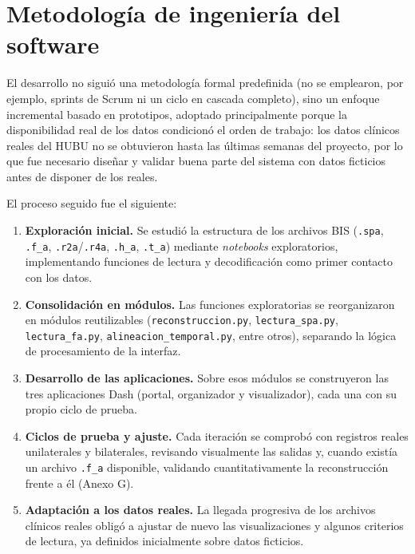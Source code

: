 \documentclass[
  spanish,
  a4paper,
  12pt,
  twoside]{memoir}
\providecommand{\tightlist}{%
  \setlength{\itemsep}{0pt}\setlength{\parskip}{0pt}}
\begin{document}
\chapter{Metodología de ingeniería del
software}\label{metodologuxeda-de-ingenieruxeda-del-software}

El desarrollo no siguió una metodología formal predefinida (no se
emplearon, por ejemplo, sprints de Scrum ni un ciclo en cascada
completo), sino un enfoque incremental basado en prototipos, adoptado
principalmente porque la disponibilidad real de los datos condicionó el
orden de trabajo: los datos clínicos reales del HUBU no se obtuvieron
hasta las últimas semanas del proyecto, por lo que fue necesario diseñar
y validar buena parte del sistema con datos ficticios antes de disponer
de los reales.

El proceso seguido fue el siguiente:

\begin{enumerate}
\def\labelenumi{\arabic{enumi}.}
\tightlist
\item
  \textbf{Exploración inicial.} Se estudió la estructura de los archivos
  BIS (\texttt{.spa}, \texttt{.f\_a}, \texttt{.r2a}/\texttt{.r4a},
  \texttt{.h\_a}, \texttt{.t\_a}) mediante \emph{notebooks}
  exploratorios, implementando funciones de lectura y decodificación
  como primer contacto con los datos.
\item
  \textbf{Consolidación en módulos.} Las funciones exploratorias se
  reorganizaron en módulos reutilizables (\texttt{reconstruccion.py},
  \texttt{lectura\_spa.py}, \texttt{lectura\_fa.py},
  \texttt{alineacion\_temporal.py}, entre otros), separando la lógica de
  procesamiento de la interfaz.
\item
  \textbf{Desarrollo de las aplicaciones.} Sobre esos módulos se
  construyeron las tres aplicaciones Dash (portal, organizador y
  visualizador), cada una con su propio ciclo de prueba.
\item
  \textbf{Ciclos de prueba y ajuste.} Cada iteración se comprobó con
  registros reales unilaterales y bilaterales, revisando visualmente las
  salidas y, cuando existía un archivo \texttt{.f\_a} disponible,
  validando cuantitativamente la reconstrucción frente a él (Anexo G).
\item
  \textbf{Adaptación a los datos reales.} La llegada progresiva de los
  archivos clínicos reales obligó a ajustar de nuevo las visualizaciones
  y algunos criterios de lectura, ya definidos inicialmente sobre datos
  ficticios.
\end{enumerate}
\end{document}
